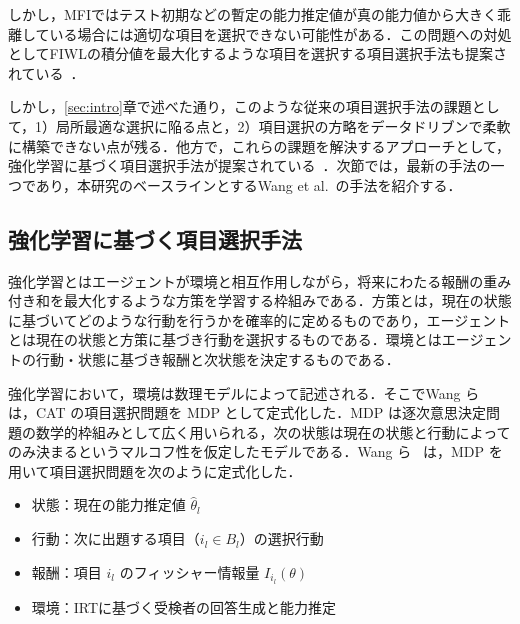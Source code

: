 \documentclass[dvipdfmx,a4j]{jarticle}
\begin{document}
しかし，MFIではテスト初期などの暫定の能力推定値が真の能力値から大きく乖離している場合には適切な項目を選択できない可能性がある．この問題への対処としてFIWLの積分値を最大化するような項目を選択する項目選択手法も提案されている~\cite{veerkamp1997}．

しかし，\ref{sec:intro}章で述べた通り，このような従来の項目選択手法の課題として，1）局所最適な選択に陥る点と，2）項目選択の方略をデータドリブンで柔軟に構築できない点が残る．他方で，これらの課題を解決するアプローチとして，強化学習に基づく項目選択手法が提案されている~\cite{ghosh2021,nurakhmetov2019,shin2022,wang2024}．次節では，最新の手法の一つであり，本研究のベースラインとするWang et al.~\cite{wang2024}の手法を紹介する．




\subsection{強化学習に基づく項目選択手法}

強化学習とはエージェントが環境と相互作用しながら，将来にわたる報酬の重み付き和を最大化するような方策を学習する枠組みである．方策とは，現在の状態に基づいてどのような行動を行うかを確率的に定めるものであり，エージェントとは現在の状態と方策に基づき行動を選択するものである．環境とはエージェントの行動・状態に基づき報酬と次状態を決定するものである．

強化学習において，環境は数理モデルによって記述される．そこでWang ら~\cite{wang2024} は，CAT の項目選択問題を MDP として定式化した．MDP は逐次意思決定問題の数学的枠組みとして広く用いられる，次の状態は現在の状態と行動によってのみ決まるというマルコフ性を仮定したモデルである．Wang ら~\cite{wang2024} は，MDP を用いて項目選択問題を次のように定式化した．

\begin{itemize}
\item 状態：現在の能力推定値 $\hat{\theta}_l$
\item 行動：次に出題する項目（$i_l \in B_l$）の選択行動
\item 報酬：項目 $i_l$ のフィッシャー情報量 $I_{i_l}(\theta)$
\item 環境：IRTに基づく受検者の回答生成と能力推定
\end{itemize}

\end{document}
